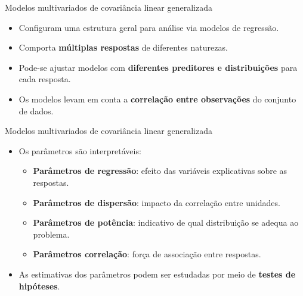 \documentclass[
  ignorenonframetext,
  serif,
  professionalfont,
  usenames,
  dvipsnames,
  aspectratio = 169]{beamer}
\begin{document}
\begin{frame}{Modelos multivariados de covariância linear generalizada}
\protect\hypertarget{modelos-multivariados-de-covariuxe2ncia-linear-generalizada-1}{}
\begin{itemize}
   
   \itemsep 2ex
   
  \item Configuram uma estrutura geral para análise via modelos de regressão.
  
  \item Comporta \textbf{múltiplas respostas} de diferentes naturezas.
  
  \item Pode-se ajustar modelos com \textbf{diferentes preditores e distribuições} para cada resposta.
  
  \item Os modelos levam em conta a \textbf{correlação entre observações} do conjunto de dados. 

\end{itemize}
\end{frame}

\begin{frame}{Modelos multivariados de covariância linear generalizada}
\protect\hypertarget{modelos-multivariados-de-covariuxe2ncia-linear-generalizada-2}{}
\begin{itemize}
   
   \itemsep 2ex
  
  \item Os parâmetros são interpretáveis:
  
    \begin{itemize}
    
    \itemsep 2ex
      
      \item \textbf{Parâmetros de regressão}: efeito das variáveis explicativas sobre as respostas.
      
      \item \textbf{Parâmetros de dispersão}: impacto da correlação entre unidades.
      
      \item \textbf{Parâmetros de potência}: indicativo de qual distribuição se adequa ao problema.
      
      \item \textbf{Parâmetros correlação}: força de associação entre respostas.
      
    \end{itemize}

  \item As estimativas dos parâmetros podem ser estudadas por meio de \textbf{testes de hipóteses}.
\end{itemize}
\end{frame}
\end{document}
